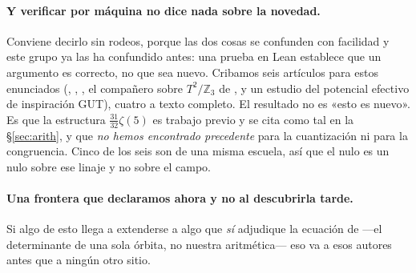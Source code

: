 \documentclass[11pt,a4paper]{article}
\newcommand{\ZZ}{\mathbb{Z}}
\begin{document}
\paragraph{Y verificar por máquina no dice nada sobre la novedad.} Conviene decirlo sin rodeos,
porque las dos cosas se confunden con facilidad y este grupo ya las ha confundido antes: una prueba
en Lean establece que un argumento es correcto, no que sea nuevo. Cribamos seis artículos para
estos enunciados (\cite{HHHK03}, \cite{HY04}, \cite{HNT}, el compañero sobre $T^2/\ZZ_3$ de
\cite{KTY17}, \cite{TZ4} y un estudio del potencial efectivo de inspiración GUT), cuatro a texto
completo. El resultado no es «esto es nuevo». Es que la estructura $\tfrac{31}{32}\zeta(5)$ es
trabajo previo y se cita como tal en la \S\ref{sec:arith}, y que \emph{no hemos encontrado
precedente} para la cuantización ni para la congruencia. Cinco de los seis son de una misma
escuela, así que el nulo es un nulo sobre ese linaje y no sobre el campo.

\paragraph{Una frontera que declaramos ahora y no al descubrirla tarde.} Si algo de esto llega a
extenderse a algo que \emph{sí} adjudique la ecuación de \cite{KM25} ---el determinante de una sola
órbita, no nuestra aritmética--- eso va a esos autores antes que a ningún otro sitio.
\end{document}
